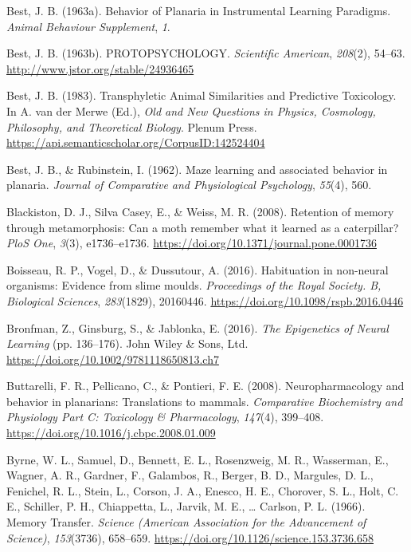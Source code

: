 \documentclass[
  jou,
  floatsintext,
  longtable,
  nolmodern,
  notxfonts,
  notimes,
  donotrepeattitle,
  colorlinks=true,linkcolor=blue,citecolor=blue,urlcolor=blue]{apa7}
\newlength{\cslhangindent}
\newenvironment{CSLReferences}[2] %
 {\begin{list}{}{%
  \setlength{\itemindent}{0pt}
  \setlength{\leftmargin}{0pt}
  \setlength{\parsep}{0pt}
  \ifodd #1
   \setlength{\leftmargin}{\cslhangindent}
   \setlength{\itemindent}{-1\cslhangindent}
  \fi
  \setlength{\itemsep}{#2\baselineskip}}}
 {\end{list}}
\begin{document}
\begin{CSLReferences}{1}{0}
Best, J. B. (1963a). Behavior of {Planaria} in {Instrumental} {Learning}
{Paradigms}. \emph{Animal Behaviour Supplement}, \emph{1}.

Best, J. B. (1963b). {PROTOPSYCHOLOGY}. \emph{Scientific American},
\emph{208}(2), 54--63. \url{http://www.jstor.org/stable/24936465}

Best, J. B. (1983). Transphyletic {Animal} {Similarities} and
{Predictive} {Toxicology}. In A. van der Merwe (Ed.), \emph{Old and
{New} {Questions} in {Physics}, {Cosmology}, {Philosophy}, and
{Theoretical} {Biology}}. Plenum Press.
\url{https://api.semanticscholar.org/CorpusID:142524404}

Best, J. B., \& Rubinstein, I. (1962). Maze learning and associated
behavior in planaria. \emph{Journal of Comparative and Physiological
Psychology}, \emph{55}(4), 560.

Blackiston, D. J., Silva Casey, E., \& Weiss, M. R. (2008). Retention of
memory through metamorphosis: Can a moth remember what it learned as a
caterpillar? \emph{PloS One}, \emph{3}(3), e1736--e1736.
\url{https://doi.org/10.1371/journal.pone.0001736}

Boisseau, R. P., Vogel, D., \& Dussutour, A. (2016). Habituation in
non-neural organisms: Evidence from slime moulds. \emph{Proceedings of
the Royal Society. B, Biological Sciences}, \emph{283}(1829), 20160446.
\url{https://doi.org/10.1098/rspb.2016.0446}

Bronfman, Z., Ginsburg, S., \& Jablonka, E. (2016). \emph{The
{Epigenetics} of {Neural} {Learning}} (pp. 136--176). John Wiley \&
Sons, Ltd. \url{https://doi.org/10.1002/9781118650813.ch7}

Buttarelli, F. R., Pellicano, C., \& Pontieri, F. E. (2008).
Neuropharmacology and behavior in planarians: {Translations} to mammals.
\emph{Comparative Biochemistry and Physiology Part C: Toxicology \&
Pharmacology}, \emph{147}(4), 399--408.
\url{https://doi.org/10.1016/j.cbpc.2008.01.009}

Byrne, W. L., Samuel, D., Bennett, E. L., Rosenzweig, M. R., Wasserman,
E., Wagner, A. R., Gardner, F., Galambos, R., Berger, B. D., Margules,
D. L., Fenichel, R. L., Stein, L., Corson, J. A., Enesco, H. E.,
Chorover, S. L., Holt, C. E., Schiller, P. H., Chiappetta, L., Jarvik,
M. E., \ldots{} Carlson, P. L. (1966). Memory {Transfer}. \emph{Science
(American Association for the Advancement of Science)},
\emph{153}(3736), 658--659.
\url{https://doi.org/10.1126/science.153.3736.658}


\end{CSLReferences}
\end{document}
